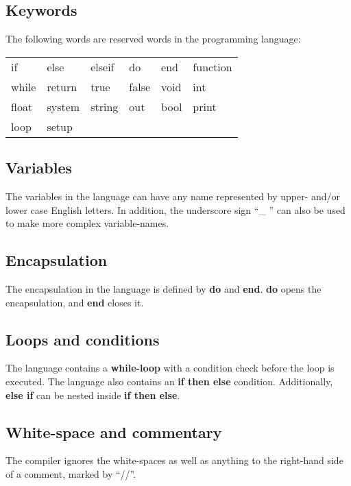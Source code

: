 \subsection{Keywords}
The following words are reserved words in the programming language:\\ 
\begin{center}
\begin{tabular}{ l l l l l l}
if & else & elseif & do & end & function \\
while & return & true & false & void & int \\
float & system & string & out & bool & print\\
loop & setup \\
\end{tabular}
\end{center}

\subsection{Variables}
The variables in the language can have any name represented by upper- and/or lower case English letters. In addition, the underscore sign ``\_ '' can also be used to make more complex variable-names. 

\subsection{Encapsulation}
The encapsulation in the language is defined by \textbf{do} and \textbf{end}. \textbf{do} opens the encapsulation, and \textbf{end} closes it.   

\subsection{Loops and conditions}
The language contains a \textbf{while-loop} with a condition check before the loop is executed. The language also contains an \textbf{if then else} condition. Additionally, \textbf{else if} can be nested inside \textbf{if then else}.   

\subsection{White-space and commentary}
The compiler ignores the white-spaces as well as anything to the right-hand side of a comment, marked by ``//''.


